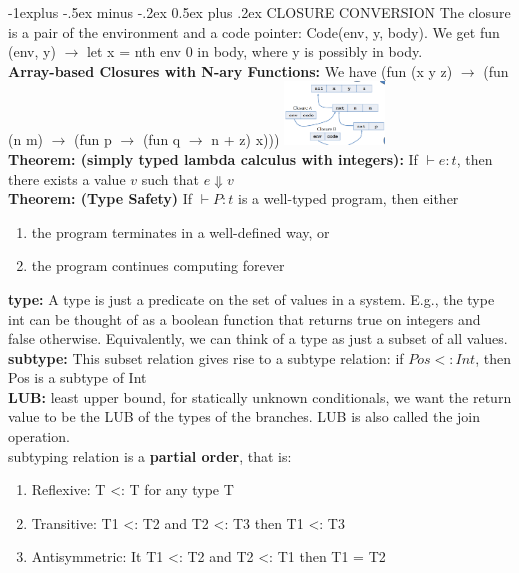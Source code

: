 \documentclass[10pt,landscape]{article}
\makeatletter
\renewcommand{\subsection}{\@startsection{subsection}{2}{0mm}%
                                {-1explus -.5ex minus -.2ex}%
                                {0.5ex plus .2ex}%
                                {\normalfont\normalsize\bfseries}}
\makeatother
\begin{document}
\begin{multicols}{3}
\subsection{CLOSURE CONVERSION}
The closure is a pair of the environment and a code pointer: Code(env, y, body). We get 
fun (env, y) $\rightarrow$ let x = nth env 0 in body, where y is possibly in body.\\
\textbf{Array-based Closures with N-ary Functions:} 
We have (fun (x y z) $\rightarrow$ (fun (n m) $\rightarrow$ (fun p $\rightarrow$ (fun q $\rightarrow$ n + z) x)))
\includegraphics[width = 0.2\textwidth]{Bilder/closure_array_based.png}\\
\textbf{Theorem: (simply typed lambda calculus with integers):} If $\vdash e : t$, then there exists a value $v$ such that $e \Downarrow v$ \\
\textbf{Theorem: (Type Safety)} If $\vdash P : t$ is a well-typed program, then either
\begin{enumerate}
  \item the program terminates in a well-defined way, or
  \item the program continues computing forever
\end{enumerate}
\textbf{type:} A type is just a predicate on the set of values in a system. E.g., the type int can be thought of as a boolean function that returns
true on integers and false otherwise. Equivalently, we can think of a type as just a subset of all values.\\
\textbf{subtype:} This subset relation gives rise to a subtype relation: if $Pos <: Int$, then Pos is a subtype of Int \\
\textbf{LUB:} least upper bound, for statically unknown conditionals, we want the return value to be
the LUB of the types of the branches. LUB is also called the join operation. \\
subtyping relation is a \textbf{partial order}, that is:
\begin{enumerate}
  \item Reflexive: T <: T for any type T
  \item Transitive: T1 <: T2 and T2 <: T3 then T1 <: T3
  \item Antisymmetric: It T1 <: T2 and T2 <: T1 then T1 = T2
\end{enumerate}

\end{multicols}
\end{document}

